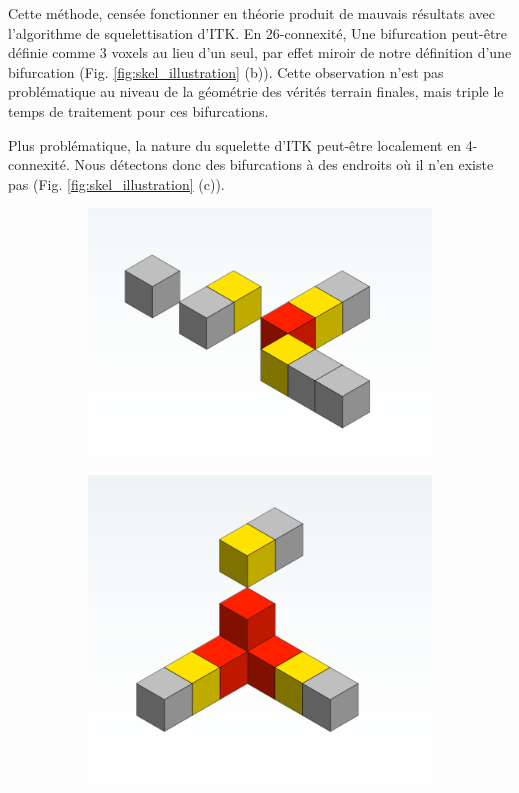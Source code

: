 Cette méthode, censée fonctionner en théorie produit de mauvais résultats avec l'algorithme de squelettisation d'ITK. En 26-connexité, Une bifurcation peut-être définie comme 3 voxels au lieu d'un seul, par effet miroir de notre définition d'une bifurcation (Fig. \ref{fig:skel_illustration} (b)). Cette observation n'est pas problématique au niveau de la géométrie des vérités terrain finales, mais triple le temps de traitement pour ces bifurcations.

Plus problématique, la nature du squelette d'ITK peut-être localement en 4-connexité. Nous détectons donc des bifurcations à des endroits où il n'en existe pas (Fig. \ref{fig:skel_illustration} (c)). 
\begin{figure}[!ht]
  \captionsetup[subfigure]{justification=centering}
  \centering
  \begin{subfigure}{0.32\textwidth}
    \centering
    \includegraphics[width=\textwidth]{Images/problem_skel0.png}
    \caption{}
  \end{subfigure}
  \begin{subfigure}{0.32\textwidth}
    \centering
    \includegraphics[width=\textwidth]{Images/problem_skel3.png}

\end{subfigure}
\end{figure}

